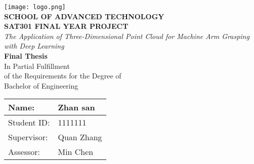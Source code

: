\documentclass[main.tex]{subfiles}
\begin{document}
\begin{titlepage}
	\centering
    \vspace*{0.5 cm}

    \texttt{[image: logo.png]} \\ [1 cm]

    {\large \bfseries SCHOOL OF ADVANCED TECHNOLOGY} \\
    {\large \bfseries SAT301 FINAL YEAR PROJECT} \\ [2 cm]

	{\LARGE \itshape The Application of Three-Dimensional Point Cloud for Machine Arm Grasping with Deep Learning} \\ [1 cm]

    {\LARGE \bfseries Final Thesis} \\ [2 cm]

    In Partial Fulfillment \\
    of the Requirements for the Degree of \\
    Bachelor of Engineering \\ [2 cm]

    \begin{table}[h!]
        \centering
        \begin{tabular}{|l|l|}
            \hline
            Name:       & Zhan san   \\ \hline
            Student ID: & 1111111    \\ \hline
            Supervisor: & Quan Zhang \\ \hline
            Assessor:   & Min Chen   \\ \hline
        \end{tabular}
    \end{table}

\end{titlepage}
\end{document}
